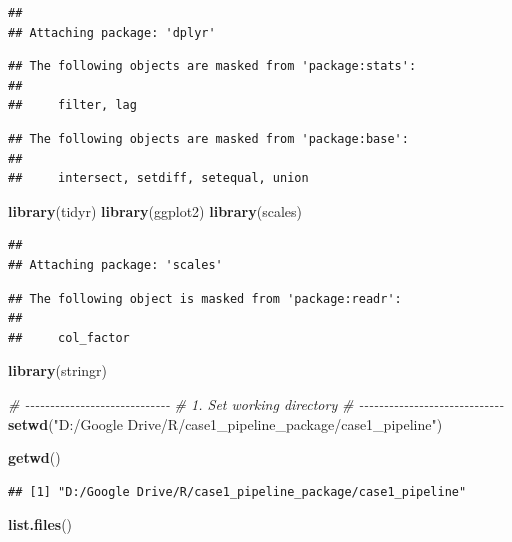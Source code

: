 \documentclass[
]{article}
\newenvironment{Shaded}{\begin{snugshade}}{\end{snugshade}}
\newcommand{\CommentTok}[1]{\textcolor[rgb]{0.56,0.35,0.01}{\textit{#1}}}
\newcommand{\FunctionTok}[1]{\textcolor[rgb]{0.13,0.29,0.53}{\textbf{#1}}}
\newcommand{\NormalTok}[1]{#1}
\newcommand{\StringTok}[1]{\textcolor[rgb]{0.31,0.60,0.02}{#1}}
\begin{document}
\begin{verbatim}
## 
## Attaching package: 'dplyr'
\end{verbatim}

\begin{verbatim}
## The following objects are masked from 'package:stats':
## 
##     filter, lag
\end{verbatim}

\begin{verbatim}
## The following objects are masked from 'package:base':
## 
##     intersect, setdiff, setequal, union
\end{verbatim}

\begin{Shaded}
\begin{Highlighting}[]
\FunctionTok{library}\NormalTok{(tidyr)}
\FunctionTok{library}\NormalTok{(ggplot2)}
\FunctionTok{library}\NormalTok{(scales)}
\end{Highlighting}
\end{Shaded}

\begin{verbatim}
## 
## Attaching package: 'scales'
\end{verbatim}

\begin{verbatim}
## The following object is masked from 'package:readr':
## 
##     col_factor
\end{verbatim}

\begin{Shaded}
\begin{Highlighting}[]
\FunctionTok{library}\NormalTok{(stringr)}

\CommentTok{\# {-}{-}{-}{-}{-}{-}{-}{-}{-}{-}{-}{-}{-}{-}{-}{-}{-}{-}{-}{-}{-}{-}{-}{-}{-}{-}{-}{-}{-}}
\CommentTok{\# 1. Set working directory}
\CommentTok{\# {-}{-}{-}{-}{-}{-}{-}{-}{-}{-}{-}{-}{-}{-}{-}{-}{-}{-}{-}{-}{-}{-}{-}{-}{-}{-}{-}{-}{-}}
\FunctionTok{setwd}\NormalTok{(}\StringTok{"D:/Google Drive/R/case1\_pipeline\_package/case1\_pipeline"}\NormalTok{)}

\FunctionTok{getwd}\NormalTok{()}
\end{Highlighting}
\end{Shaded}

\begin{verbatim}
## [1] "D:/Google Drive/R/case1_pipeline_package/case1_pipeline"
\end{verbatim}

\begin{Shaded}
\begin{Highlighting}[]
\FunctionTok{list.files}\NormalTok{()}
\end{Highlighting}
\end{Shaded}
\end{document}
